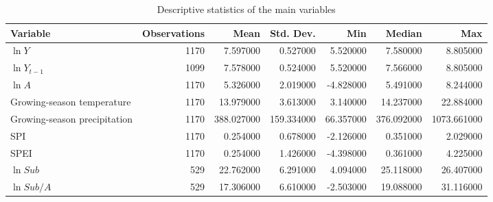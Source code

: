 \begin{table}
\caption{Descriptive statistics of the main variables}
\label{tab:descriptive}
\begin{tabular}{lrrrrrr}
\toprule
Variable & Observations & Mean & Std. Dev. & Min & Median & Max \\
\midrule
$\ln Y$ & 1170 & 7.597000 & 0.527000 & 5.520000 & 7.580000 & 8.805000 \\
$\ln Y_{t-1}$ & 1099 & 7.578000 & 0.524000 & 5.520000 & 7.566000 & 8.805000 \\
$\ln A$ & 1170 & 5.326000 & 2.019000 & -4.828000 & 5.491000 & 8.244000 \\
Growing-season temperature & 1170 & 13.979000 & 3.613000 & 3.140000 & 14.237000 & 22.884000 \\
Growing-season precipitation & 1170 & 388.027000 & 159.334000 & 66.357000 & 376.092000 & 1073.661000 \\
SPI & 1170 & 0.254000 & 0.678000 & -2.126000 & 0.351000 & 2.029000 \\
SPEI & 1170 & 0.254000 & 1.426000 & -4.398000 & 0.361000 & 4.225000 \\
$\ln Sub$ & 529 & 22.762000 & 6.291000 & 4.094000 & 25.118000 & 26.407000 \\
$\ln Sub/A$ & 529 & 17.306000 & 6.610000 & -2.503000 & 19.088000 & 31.116000 \\
\bottomrule
\end{tabular}
\end{table}
